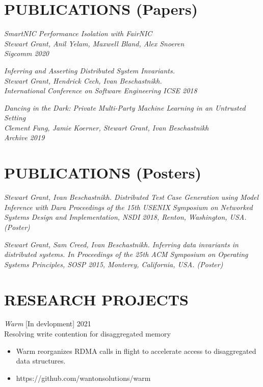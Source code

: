 \documentclass[line,margin]{res}
\begin{document}
\address{https://www.stewartgrant.ca}
\address{ssgrant@eng.ucsd.edu}
\begin{resume}

    \section{PUBLICATIONS (Papers)}

{\sl 
    SmartNIC Performance Isolation with FairNIC \\
    Stewart Grant, Anil Yelam, Maxwell Bland, Alex Snoeren\\
    Sigcomm 2020 \\
    }

{\sl 
    Inferring and Asserting Distributed System Invariants. \\
    Stewart Grant, Hendrick Cech, Ivan Beschastnikh. \\
    International Conference on Software Engineering ICSE 2018 \\
    }

{\sl 
    Dancing in the Dark: Private Multi-Party Machine Learning in an Untrusted Setting \\
    Clement Fung, Jamie Koerner, Stewart Grant, Ivan Beschastnikh \\
    Archive 2019
    }

\section{PUBLICATIONS (Posters)}

{\sl Stewart Grant, Ivan Beschastnikh. 
    Distributed Test Case Generation using Model Inference with Dara
    \it{Proceedings of the 15th
    USENIX Symposium on Networked Systems Design and Implementation, NSDI 2018},
    Renton, Washington, USA. (Poster)}

{\sl Stewart Grant, Sam Creed, Ivan Beschastnikh. Inferring data
    invariants in distributed systems. In \it{Proceedings of the 25th
    ACM Symposium on Operating Systems Principles, SOSP 2015},
    Monterey, California, USA. (Poster)}


\section{RESEARCH PROJECTS}

{\sl Warm} [In devlopment] \hfill 2021\\
    Resolving write contention for disaggregated memory
\begin{itemize} \itemsep -2pt
        \item Warm reorganizes RDMA calls in flight to accelerate access to disaggregated data structures.
        \item https://github.com/wantonsolutions/warm
\end{itemize}


\end{resume}
\end{document}
